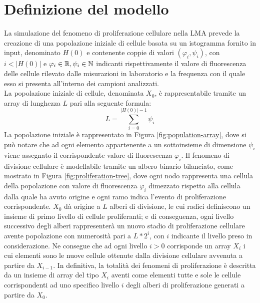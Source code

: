 \section{Definizione del modello}
La simulazione del fenomeno di proliferazione cellulare nella LMA 
prevede la creazione di una popolazione iniziale
di cellule basata su un istogramma fornito in input, denominato $H(0)$ e 
contenente coppie di valori $(\varphi_{i}, \psi_{i})$,
con $i < |H(0)|$ e $\varphi_{i} \in \mathbb{R}, \psi_{i} \in \mathbb{N}$
indicanti rispettivamente il
valore di fluorescenza delle cellule rilevato dalle misurazioni in laboratorio e
la frequenza con il quale esso si presenta all'interno dei campioni analizzati.
\\
La popolazione iniziale di cellule, denominata $X_{0}$, è rappresentabile
tramite un array di
lunghezza $L$ pari alla seguente formula: 
$$L = \sum_{i=0}^{|H(0)| - 1} \psi_{i}$$
La popolazione iniziale è rappresentato in Figura \ref{fig:population-array}, 
dove si può notare che ad ogni elemento
appartenente a un sottoinsieme di dimensione $\psi_{i}$ viene assegnato il corrispondente
valore di fluorescenza $\varphi_{i}$.
Il fenomeno di divisione cellulare è modellabile tramite un albero binario 
bilanciato,
come mostrato in Figura \ref{fig:proliferation-tree}, dove ogni nodo rappresenta
una cellula della popolazione con valore di fluorescenza $\varphi_{i}$
dimezzato rispetto alla cellula dalla quale ha avuto origine e ogni
ramo indica l'evento di proliferazione corrispondente.
$X_{0}$ dà origine a $L$ alberi di
divisione, le cui radici definiscono un insieme di primo livello di cellule
proliferanti; e di conseguenza, ogni livello successivo degli alberi rappresenterà
un nuovo stadio di proliferazione cellulare avente popolazione con numerosità
pari a $L * 2^{i}$, con $i$ indicante il livello preso in considerazione.
Ne consegue che ad ogni livello $i > 0$ corrisponde un array $X_{i}$ i cui
elementi sono le nuove cellule ottenute dalla divisione cellulare avvenuta a 
partire da $X_{i-1}$.
In definitiva, la totalità dei fenomeni di proliferazione è descritta da un
insieme di array del tipo $X_{i}$ aventi come elementi tutte e sole le cellule
corrispondenti ad uno specifico livello $i$ degli alberi di proliferazione
generati a partire da $X_{0}$.
